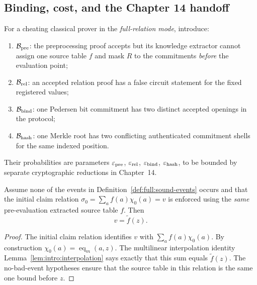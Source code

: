 \subsection{Binding, cost, and the Chapter 14 handoff}\label{sec:full:boundary}

\begin{definition}\label{def:full:sound-events}
For a cheating classical prover in the
\emph{full-relation mode}, introduce:
\begin{enumerate}[label=\textup{(\roman*)}]
\item $\mathcal B_{\rm pre}$:
the preprocessing proof accepts
but its knowledge extractor cannot
assign one source table $f$ and
mask $R$ to the commitments
\emph{before} the evaluation point;
\item $\mathcal B_{\rm rel}$:
an accepted relation proof
has a false circuit statement
for the fixed registered values;
\item $\mathcal B_{\rm bind}$:
one Pedersen bit commitment
has two distinct accepted
openings in the protocol;
\item $\mathcal B_{\rm hash}$:
one Merkle root has two
conflicting authenticated
commitment shells for the
same indexed position.
\end{enumerate}
Their probabilities are parameters
$\varepsilon_{\rm pre}$,
$\varepsilon_{\rm rel}$,
$\varepsilon_{\rm bind}$,
$\varepsilon_{\rm hash}$,
to be bounded by separate
cryptographic reductions in
Chapter~14.
\end{definition}

\begin{lemma}\label{lem:full:fixed-eval}
Assume none of the events in
Definition~\ref{def:full:sound-events}
occurs and that the initial
claim relation
$\sigma_0=\sum_a f(a)\chi_0(a)=v$
is enforced using the \emph{same}
pre-evaluation extracted source
table $f$. Then
\[
 \boxed{v=\widetilde f(z).}
\]
\end{lemma}
\begin{proof}
The initial claim relation
identifies $v$ with
$\sum_a f(a)\chi_0(a)$.
By construction
$\chi_0(a)=\operatorname{eq}_m(a,z)$.
The multilinear interpolation
identity
Lemma~\ref{lem:intro:interpolation}
says exactly that this sum
equals $\widetilde f(z)$.
The no-bad-event hypotheses
ensure that the source table
in this relation is the same
one bound before $z$.
\end{proof}

